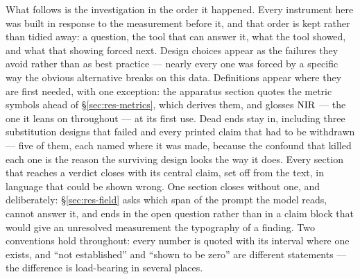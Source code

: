 What follows is the investigation in the order it happened. Every instrument here was built in
response to the measurement before it, and that order is kept rather than tidied away: a question,
the tool that can answer it, what the tool showed, and what that showing forced next. Design choices
appear as the failures they avoid rather than as best practice --- nearly every one was forced by a
specific way the obvious alternative breaks on this data. Definitions appear where they are first
needed, with one exception: the apparatus section quotes the metric symbols ahead of
\S\ref{sec:res-metrics}, which derives them, and glosses $\textrm{NIR}$ --- the one it leans on
throughout --- at its first use. Dead ends stay in, including three substitution designs that failed and every printed claim
that had to be withdrawn --- five of them, each named where it was made, because the confound that killed each one is the reason the surviving
design looks the way it does. Every section that reaches a verdict closes with its central claim, set
off from the text, in language that could be shown wrong. One section closes without one, and
deliberately: \S\ref{sec:res-field} asks which span of the prompt the model reads, cannot answer it,
and ends in the open question rather than in a claim block that would give an unresolved measurement
the typography of a finding. Two conventions hold throughout: every number is quoted with its
interval where one exists, and ``not established'' and ``shown to be zero'' are different statements
--- the difference is load-bearing in several places.

